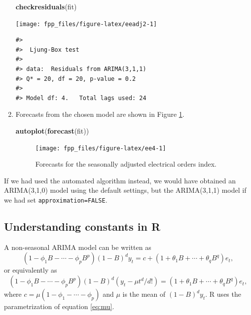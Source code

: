 \documentclass[]{book}
\newenvironment{Shaded}{\begin{snugshade}}{\end{snugshade}}
\newcommand{\KeywordTok}[1]{\textcolor[rgb]{0.13,0.29,0.53}{\textbf{#1}}}
\newcommand{\NormalTok}[1]{#1}
\begin{document}
\begin{enumerate}
\begin{Shaded}
\begin{Highlighting}[]
\KeywordTok{checkresiduals}\NormalTok{(fit)}
\end{Highlighting}
\end{Shaded}

  \begin{center}\texttt{[image: fpp\_files/figure-latex/eeadj2-1]} \end{center}

\begin{verbatim}
#> 
#>  Ljung-Box test
#> 
#> data:  Residuals from ARIMA(3,1,1)
#> Q* = 20, df = 20, p-value = 0.2
#> 
#> Model df: 4.   Total lags used: 24
\end{verbatim}
\item
  Forecasts from the chosen model are shown in Figure \ref{fig:ee4}.

\begin{Shaded}
\begin{Highlighting}[]
\KeywordTok{autoplot}\NormalTok{(}\KeywordTok{forecast}\NormalTok{(fit))}
\end{Highlighting}
\end{Shaded}

  \begin{figure}

  {\centering \texttt{[image: fpp\_files/figure-latex/ee4-1]} 

  }

  \caption{Forecasts for the seasonally adjusted electrical orders index.}\label{fig:ee4}
  \end{figure}
\end{enumerate}

If we had used the automated algorithm instead, we would have obtained an ARIMA(3,1,0) model using the default settings, but the ARIMA(3,1,1) model if we had set \texttt{approximation=FALSE}.

\hypertarget{understanding-constants-in-r}{%
\subsection*{Understanding constants in R}\label{understanding-constants-in-r}}

A non-seasonal ARIMA model can be written as
\begin{equation}
\label{eq:c}
  (1-\phi_1B - \cdots - \phi_p B^p)(1-B)^d y_t = c + (1 + \theta_1 B + \cdots + \theta_q B^q)e_t,
\end{equation}
or equivalently as
\begin{equation}
\label{eq:mu}
  (1-\phi_1B - \cdots - \phi_p B^p)(1-B)^d (y_t - \mu t^d/d!) = (1 + \theta_1 B + \cdots + \theta_q B^q)e_t,
\end{equation}
where \(c = \mu(1-\phi_1 - \cdots - \phi_p )\) and \(\mu\) is the mean of \((1-B)^d y_t\). R uses the parametrization of equation \eqref{eq:mu}.
\end{document}
